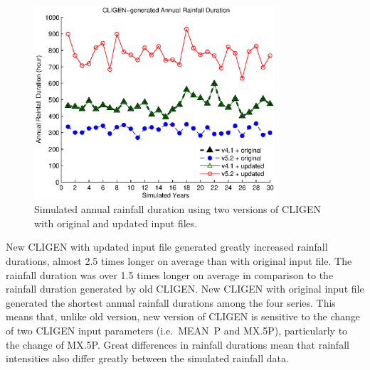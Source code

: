 \begin{figure}[htbp]
  \centering
\includegraphics[width=0.8\textwidth]{./img/cligen_annual_duration_series}
  \caption{Simulated annual rainfall duration using two versions of CLIGEN
with original and updated input files.}
  \label{fig:cligen_annual_duration}
\end{figure}

New CLIGEN with updated input file generated greatly increased rainfall
durations, almost 2.5 times longer on average than with original input file. The
rainfall duration was over 1.5 times longer on average in comparison to the
rainfall duration generated by old CLIGEN. New CLIGEN with original input file
generated the shortest annual rainfall durations among the four series.
This means that, unlike old version, new version of CLIGEN is sensitive to
the change of two CLIGEN input parameters (i.e.\ MEAN~P and {MX.5P}),
particularly to the change of {MX.5P}. Great differences in rainfall durations
mean that rainfall intensities also differ greatly between the simulated
rainfall data.



